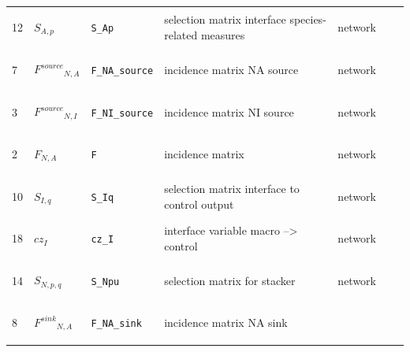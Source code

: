 \begin{longtable}{|p{1cm}|p{2.5cm}|p{4.5cm}|p{8cm}|p{3.0cm}|p{3cm}|p{1cm}|}
            12
             & \hypertarget{"v:12"}{ $ {{S}}{_{A, p}} $}
             & \verb|S_Ap|
             & selection matrix interface species-related measures
             & \begin{lay}network \end{lay}
             & $  $
             & \\
            7
             & \hypertarget{"v:7"}{ $ {{F^{source}}}{_{N, A}} $}
             & \verb|F_NA_source|
             & incidence matrix NA source
             & \begin{lay}network \end{lay}
             & $  $
             & \\
            3
             & \hypertarget{"v:3"}{ $ {{F^{source}}}{_{N, I}} $}
             & \verb|F_NI_source|
             & incidence matrix NI source
             & \begin{lay}network \end{lay}
             & $  $
             & \\
            2
             & \hypertarget{"v:2"}{ $ {{F}}{_{N, A}} $}
             & \verb|F|
             & incidence matrix
             & \begin{lay}network \end{lay}
             & $  $
             & \\
            10
             & \hypertarget{"v:10"}{ $ {{S}}{_{I, q}} $}
             & \verb|S_Iq|
             & selection matrix interface to control output
             & \begin{lay}network \end{lay}
             & $  $
             & \\
            18
             & \hypertarget{"v:18"}{ $ {{cz}}{_{I}} $}
             & \verb|cz_I|
             & interface variable macro --> control
             & \begin{lay}network \end{lay}
             & $  $
             & \\
            14
             & \hypertarget{"v:14"}{ $ {{S}}{_{N, p, q}} $}
             & \verb|S_Npu|
             & selection matrix for stacker
             & \begin{lay}network \end{lay}
             & $  $
             & \\
            8
             & \hypertarget{"v:8"}{ $ {{F^{sink}}}{_{N, A}} $}
             & \verb|F_NA_sink|
             & incidence matrix NA sink

\end{longtable}
